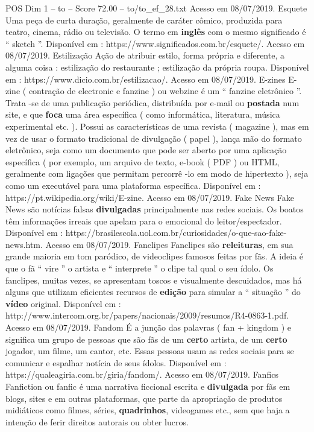 \begin{textsample}{POS Dim 1 – to – Score 72.00 – to/to\_ef\_28.txt}
Acesso em 08/07/2019.
Esquete Uma peça de curta duração, geralmente de caráter cômico, produzida para teatro, cinema, rádio ou televisão.
O termo em \textbf{inglês} com o mesmo significado é “ sketch ”.
Disponível em : https://www.significados.com.br/esquete/.
Acesso em 08/07/2019.
Estilização Ação de atribuir estilo, forma própria e diferente, a alguma coisa : estilização do restaurante ; estilização da própria roupa.
Disponível em : https://www.dicio.com.br/estilizacao/.
Acesso em 08/07/2019.
E-zines E-zine ( contração de electronic e fanzine ) ou webzine é um “ fanzine eletrônico ”.
Trata -se de uma publicação periódica, distribuída por e-mail ou \textbf{postada} num site, e que \textbf{foca} uma área específica ( como informática, literatura, música experimental etc. ).
Possui as características de uma revista ( magazine ), mas em vez de usar o formato tradicional de divulgação ( papel ), lança mão do formato eletrônico, seja como um documento que pode ser aberto por uma aplicação específica ( por exemplo, um arquivo de texto, e-book ( PDF ) ou HTML, geralmente com ligações que permitam percorrê -lo em modo de hipertexto ), seja como um executável para uma plataforma específica.
Disponível em : https://pt.wikipedia.org/wiki/E-zine.
Acesso em 08/07/2019.
Fake News Fake News são notícias falsas \textbf{divulgadas} principalmente nas redes sociais.
Os boatos têm informações irreais que apelam para o emocional do leitor/espectador.
Disponível em : https://brasilescola.uol.com.br/curiosidades/o-que-sao-fake-news.htm.
Acesso em 08/07/2019.
Fanclipes Fanclipes são \textbf{releituras}, em sua grande maioria em tom paródico, de videoclipes famosos feitas por fãs.
A ideia é que o fã “ vire ” o artista e “ interprete ” o clipe tal qual o seu ídolo.
Os fanclipes, muitas vezes, se apresentam toscos e visualmente descuidados, mas há alguns que utilizam eficientes recursos de \textbf{edição} para simular a “ situação ” do \textbf{vídeo} original.
Disponível em : http://www.intercom.org.br/papers/nacionais/2009/resumos/R4-0863-1.pdf.
Acesso em 08/07/2019.
Fandom É a junção das palavras ( fan + kingdom ) e significa um grupo de pessoas que são fãs de um \textbf{certo} artista, de um \textbf{certo} jogador, um filme, um cantor, etc.
Essas pessoas usam as redes sociais para se comunicar e espalhar notícia de seus ídolos.
Disponível em : https://qualeagiria.com.br/giria/fandom/.
Acesso em 08/07/2019.
Fanfics Fanfiction ou fanfic é uma narrativa ficcional escrita e \textbf{divulgada} por fãs em blogs, sites e em outras plataformas, que parte da apropriação de produtos midiáticos como filmes, séries, \textbf{quadrinhos}, videogames etc., sem que haja a intenção de ferir direitos autorais ou obter lucros.

\end{textsample}
